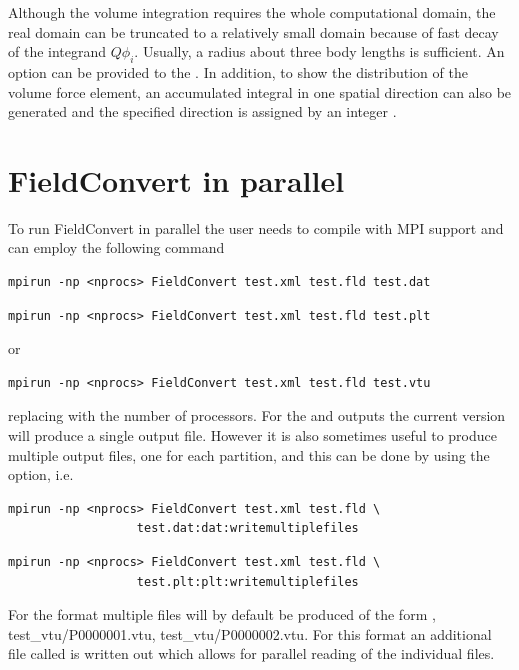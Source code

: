 Although the volume integration requires the whole computational domain, the real domain can be truncated to a relatively small domain because of fast decay of the integrand $Q\phi_i$. Usually, a radius about three body lengths is sufficient. An option  can be provided to the . In addition, to show the distribution of the volume force element, an accumulated integral in one spatial direction can also be generated and the specified direction is assigned by an integer .

\section{FieldConvert in parallel}
To run FieldConvert in parallel the user needs to compile
\nekpp with MPI support and can employ the following
command
\begin{lstlisting}[style=BashInputStyle]
mpirun -np <nprocs> FieldConvert test.xml test.fld test.dat
\end{lstlisting}
\begin{lstlisting}[style=BashInputStyle]
mpirun -np <nprocs> FieldConvert test.xml test.fld test.plt
\end{lstlisting}
or
\begin{lstlisting}[style=BashInputStyle]
mpirun -np <nprocs> FieldConvert test.xml test.fld test.vtu
\end{lstlisting}
replacing  with the number of processors. For the
 and  outputs the current version will produce
a single output file.  However it is also sometimes useful to produce
multiple output files, one for each partition, and this
can be done by using the  option, i.e.
\begin{lstlisting}[style=BashInputStyle]
  mpirun -np <nprocs> FieldConvert test.xml test.fld \
                  test.dat:dat:writemultiplefiles
\end{lstlisting}
\begin{lstlisting}[style=BashInputStyle]
  mpirun -np <nprocs> FieldConvert test.xml test.fld \
                  test.plt:plt:writemultiplefiles
\end{lstlisting}

For the  format multiple files will by default be produced
of the form , {test\_vtu/P0000001.vtu},
{test\_vtu/P0000002.vtu}. For this format an additional file called
\inltt{test.pvtu} is written out which allows for parallel reading of the
individual \inltt{.vtu} files.

